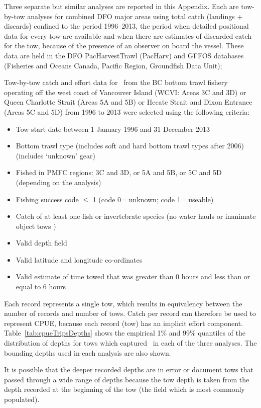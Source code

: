 Three separate but similar analyses are reported in this Appendix. Each are tow-by-tow analyses for combined DFO major areas using total catch (landings + discards) confined to the period 1996–2013, the period when detailed positional data for every tow are available and when there are estimates of discarded catch for the tow, because of the presence of an observer on board the vessel. These data are held in the DFO PacHarvestTrawl (PacHarv) and GFFOS databases (Fisheries and Oceans Canada, Pacific Region, Groundfish Data Unit);

Tow-by-tow catch and effort data for \fishname\ from the BC bottom trawl fishery operating off the west coast of Vancouver Island (WCVI: Areas 3C and 3D) or Queen Charlotte Strait (Areas 5A and 5B) or Hecate Strait and Dixon Entrance (Areas 5C and 5D) from 1996 to 2013 were selected using the following criteria:

\begin{itemize}
  \item{Tow start date between 1 January 1996 and 31 December 2013}
  \item{Bottom trawl type (includes soft and hard bottom trawl types after 2006) (includes ‘unknown’ gear)}
  \item{Fished in PMFC regions: 3C and 3D, or 5A and 5B, or 5C and 5D (depending on the analysis)}
  \item{Fishing success code $\leq$ 1 (code 0= unknown; code 1= useable)}
  \item{Catch of at least one fish or invertebrate species (no water hauls or inanimate object tows )}
  \item{Valid depth field}
  \item{Valid latitude and longitude co-ordinates}
  \item{Valid estimate of time towed that was greater than 0 hours and less than or equal to 6 hours}
\end{itemize}

Each record represents a single tow, which results in equivalency between the number of records and number of tows. Catch per record can therefore be used to represent CPUE, because each record (tow) has an implicit effort component. Table~\ref{tab:cpueTripsDepths} shows the empirical 1\% and 99\% quantiles of the distribution of depths for tows which captured \fishname\ in each of the three analyses. The bounding depths used in each analysis are also shown.

It is possible that the deeper recorded depths are in error or document tows that passed through a wide range of depths because the tow depth is taken from the depth recorded at the beginning of the tow (the field which is most commonly populated).

